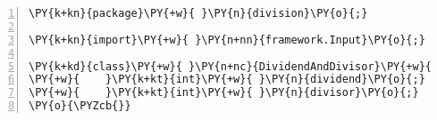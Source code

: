 \begin{Verbatim}[commandchars=\\\{\},numbers=left,firstnumber=1,stepnumber=1,frame=single,fontsize=\small]
\PY{k+kn}{package}\PY{+w}{ }\PY{n}{division}\PY{o}{;}

\PY{k+kn}{import}\PY{+w}{ }\PY{n+nn}{framework.Input}\PY{o}{;}

\PY{k+kd}{class}\PY{+w}{ }\PY{n+nc}{DividendAndDivisor}\PY{+w}{ }\PY{k+kd}{implements}\PY{+w}{ }\PY{n}{Input}\PY{+w}{ }\PY{o}{\PYZob{}}
\PY{+w}{    }\PY{k+kt}{int}\PY{+w}{ }\PY{n}{dividend}\PY{o}{;}
\PY{+w}{    }\PY{k+kt}{int}\PY{+w}{ }\PY{n}{divisor}\PY{o}{;}
\PY{o}{\PYZcb{}}
\end{Verbatim}

